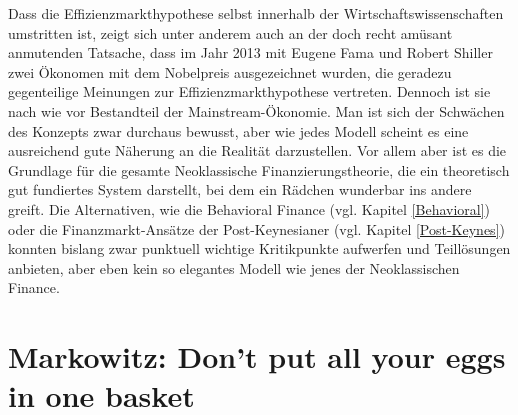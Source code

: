 Dass die Effizienzmarkthypothese selbst innerhalb der Wirtschaftswissenschaften umstritten ist, zeigt sich unter anderem auch an der doch recht amüsant anmutenden Tatsache, dass im Jahr 2013 mit Eugene Fama und Robert Shiller zwei Ökonomen mit dem Nobelpreis ausgezeichnet wurden, die geradezu gegenteilige Meinungen zur Effizienzmarkthypothese vertreten. Dennoch ist sie nach wie vor Bestandteil der Mainstream-Ökonomie. Man ist sich der Schwächen des Konzepts zwar durchaus bewusst, aber wie jedes Modell scheint es eine ausreichend gute Näherung an die Realität darzustellen. Vor allem aber ist es die Grundlage für die gesamte Neoklassische Finanzierungstheorie, die ein theoretisch gut fundiertes System darstellt, bei dem ein Rädchen wunderbar ins andere greift. Die Alternativen, wie die Behavioral Finance (vgl. Kapitel \ref{Behavioral}) oder die Finanzmarkt-Ansätze der Post-Keynesianer (vgl. Kapitel \ref{Post-Keynes}) konnten bislang zwar punktuell wichtige Kritikpunkte aufwerfen und Teillösungen anbieten, aber eben kein so elegantes Modell wie jenes der Neoklassischen Finance.


\section{Markowitz: Don't put all your eggs in one basket}
\label{Portfolio}

